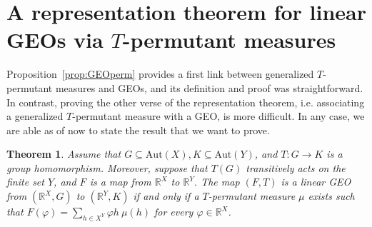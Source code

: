 \documentclass[11pt]{article}
\newtheorem{theorem}{Theorem}[section]
\newtheorem{rem}[theorem]{Remark}
\begin{document}
\section{A representation theorem for linear GEOs via $T$-permutant measures} 
\label{Representation}

Proposition~\ref{prop:GEOperm} provides a first link between generalized $T$-permutant measures and GEOs, and its definition and proof was straightforward. In contrast, proving the other verse of the representation theorem, i.e. associating a generalized $T$-permutant measure with a GEO, is more difficult. In any case, we are able as of now to state the result that we want to prove.


\begin{theorem}
    \label{maint} 
    Assume that $G \subseteq \mathrm{Aut}(X), K \subseteq \mathrm{Aut}(Y)$, and $T \colon G \to K$ is a group homomorphism. Moreover, suppose that $T(G)$ transitively acts on the finite set $Y$, and $F$ is a map from $\mathbb{R}^X$ to $\mathbb{R}^Y$. The map $(F,T)$ is a linear GEO from $(\mathbb{R}^X, G)$ to $(\mathbb{R}^Y, K)$ if and only if a $T$-permutant measure $\mu$ exists such that $F(\varphi) = \sum_{h \in X^Y} \varphi h\  \mu(h)$ for every $\varphi \in \mathbb{R}^X$.
\end{theorem}
\end{document}
